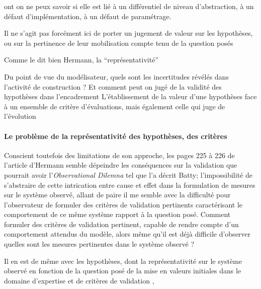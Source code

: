 

ont on ne peux savoir si elle est lié à un différentiel de niveau d'abstraction, à un défaut d'implémentation, à un défaut de paramétrage.

Il ne s'agit pas forcément ici de porter un jugement de valeur sur les hypothèses, ou sur la pertinence de leur mobilisation compte tenu de la question posés

Comme le dit bien Hermann, la \enquote{représentativité}


Du point de vue du modélisateur, quels sont les incertitudes révélés dans l'activité de construction ? Et comment peut on jugé de la validité des hypothèses dans l'encadrement L'établissement de la valeur d'une hypothèses face à un ensemble de critère d'évaluations, mais également celle qui juge de l'évolution

\paragraph{Le problème de la représentativité des hypothèses, des critères}

Conscient toutefois des limitations de son approche, les pages 225 à 226 de l'article d'Hermann semble dépeindre les conséquences sur la validation que pourrait avoir l'\textit{Observational Dilemna} tel que l'a décrit Batty; l'impossibilité de s'abstraire de cette intrication entre cause et effet dans la formulation de mesures sur le système observé, allant de paire il me semble avec la difficulté pour l'observateur de formuler des critères de validation pertinents caractérisant le comportement de ce même système rapport à la question posé. Comment formuler des critères de validation pertinent, capable de rendre compte d'un comportement attendus du modèle, alors même qu'il est déjà difficile d'observer quelles sont les mesures pertinentes dans le système observé ?

Il en est de même avec les hypothèses, dont la représentativité sur le système observé en fonction de la question posé  de la mise en valeurs initiales dans le domaine d'expertise et de critères de validation ,


